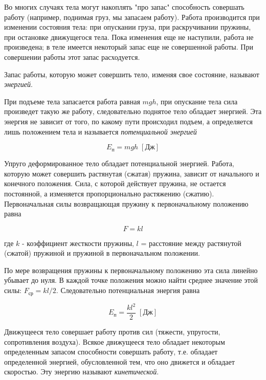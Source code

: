 \documentclass[a4paper,12pt]{article}
\begin{document}
		Во многих случаях тела могут накоплять "про запас" способность совершать работу 
		(например, поднимая груз, мы запасаем работу). Работа производится при изменении 
		состояния тела: при опускании груза, при раскручивании пружины, при остановке
		движущегося тела. Пока изменения еще не наступили, работа не произведена; в теле 
		имеется некоторый запас еще не совершенной работы. При совершении работы этот 
		запас расходуется.

		Запас работы, которую может совершить тело, изменяя свое состояние, называют 
		\textit{энергией}.

		При подъеме тела запасается работа равная $mgh$, при опускание тела сила произведет 
		такую же работу, следовательно поднятое тело обладает энергией. Эта энергия не
		зависит от того, по какому пути происходил подъем, а определяется лишь положением 
		тела и называется \textit{потенциальной энергией}

		\begin{equation}
			E_{\text{п}} = mgh \; [\text{Дж}]
		\end{equation}

		Упруго деформированное тело обладает потенциальной энергией. Работа, которую может
		совершить растянутая (сжатая) пружина, зависит от начального и конечного положения.
		Сила, с которой действует пружина, не остается постоянной, а изменяется пропорционально
		растяжению (сжатию). Первоначальная силы возвращающая пружину к первоначальному
		положению равна

		\begin{equation}
			F = kl
		\end{equation}

		где $k$ - коэффициент жесткости пружины, $l$ = расстояние между растянутой (сжатой)
		пружиной и пружиной в первоначальном положении.

		По мере возвращения пружины к первоначальному положению эта сила линейно убывает
		до нуля. В каждой точке положения можно найти среднее значение этой силы: 
		$F_{\text{ср}} = kl/2$. Следовательно потенциальная энергия равна

		\begin{equation}
			E_{\text{п}} = \frac{kl^2}{2} \; [\text{Дж}]
		\end{equation}

		Движущееся тело совершает работу против сил (тяжести, упругости, сопротивления 
		воздуха). Всякое движущееся тело обладает некоторым определенным запасом способности 
		совершать работу, т.е. обладает определенной энергией, обусловленной тем, что оно 
		движется и обладает скоростью. Эту энергию называют \textit{кинетической}.
		
\end{document}
